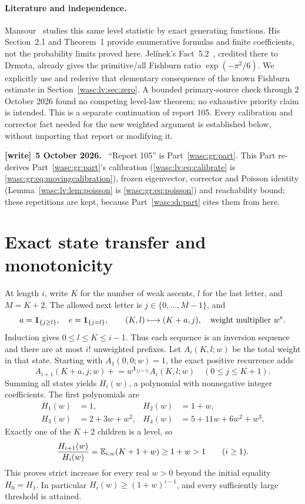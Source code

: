 \documentclass[11pt,a4paper]{article}
\theoremstyle{remark}\newtheorem{remark}[theorem]{Remark}
\newcommand{\ind}{\mathbf 1}\newcommand{\wasc}{\operatorname{wasc}}\newcommand{\dasc}{\operatorname{dasc}}
\numberwithin{equation}{section}
\newenvironment{writenote}[1][]{\par\smallskip\begingroup\small
 \noindent\textbf{[write]}\if\relax\detokenize{#1}\relax\else~\textbf{#1.}\fi\ }%
 {\par\endgroup\smallskip}
\begin{document}
\paragraph{Literature and independence.}
Mansour~\cite{mansour} studies this same level statistic by exact generating functions. His Section~2.1 and Theorem~1 provide enumerative formulas and finite coefficients, not the probability limits proved here. Jel\'inek's Fact~5.2~\cite{jelinek}, credited there to Drmota, already gives the primitive/all Fishburn ratio $\exp(-\pi^2/6)$. We explicitly use and rederive that elementary consequence of the known Fishburn estimate in Section~\ref{wasc:lv:sec:zero}. A bounded primary-source check through 2 October 2026 found no competing level-law theorem; no exhaustive priority claim is intended. This is a separate continuation of report 105. Every calibration and corrector fact needed for the new weighted argument is established below, without importing that report or modifying it.
\begin{writenote}[5 October 2026]
``Report 105'' is Part~\ref{wasc:gr:part}. This Part re-derives Part~\ref{wasc:gr:part}'s calibration (\eqref{wasc:lv:eq:calibrate} is \eqref{wasc:gr:eq:movingcalibration}), frozen eigenvector, corrector and Poisson identity (Lemma~\ref{wasc:lv:lem:poisson} is \eqref{wasc:gr:eq:poisson}) and reachability bound; these repetitions are kept, because Part~\ref{wasc:sh:part} cites them from here.
\end{writenote}

\section{Exact state transfer and monotonicity}\label{wasc:lv:sec:states}
At length $i$, write $K$ for the number of weak ascents, $l$ for the last letter, and $M=K+2$. The allowed next letter is $j\in\{0,\ldots,M-1\}$, and
\begin{equation}\label{wasc:lv:eq:transition}
a=\ind_{\{j\ge l\}},\quad e=\ind_{\{j=l\}},\qquad
(K,l)\longmapsto(K+a,j),\quad\hbox{weight multiplier }w^e.
\end{equation}
Induction gives $0\le l\le K\le i-1$. Thus each sequence is an inversion sequence and there are at most $i!$ unweighted prefixes.
Let $A_i(K,l;w)$ be the total weight in that state. Starting with
$A_1(0,0;w)=1$, the exact positive recurrence adds
\[
A_{i+1}(K+a,j;w)\mathrel{+}=w^{\ind_{\{j=l\}}}A_i(K,l;w)
\quad(0\le j\le K+1).
\]
Summing all states yields $H_i(w)$, a polynomial with nonnegative integer coefficients. The first polynomials are
\begin{align*}
H_1(w)&=1,& H_2(w)&=1+w,\\
H_3(w)&=2+3w+w^2,&H_4(w)&=5+11w+6w^2+w^3.
\end{align*}
Exactly one of the $K+2$ children is a level, so
\begin{equation}\label{wasc:lv:eq:monotone}
\frac{H_{i+1}(w)}{H_i(w)}=\mathbb E_{i,w}(K+1+w)\ge1+w>1\qquad(i\ge1).
\end{equation}
This proves strict increase for every real $w>0$ beyond the initial equality $H_0=H_1$. In particular $H_i(w)\ge(1+w)^{i-1}$, and every sufficiently large threshold is attained.
\end{document}
